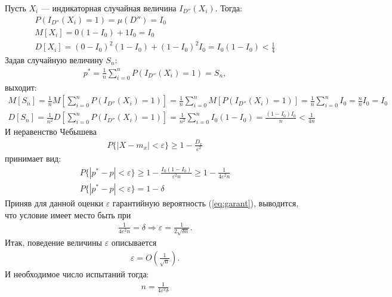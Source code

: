 Пусть \(X_i\) --- индикаторная случайная величина \(I_{D''}(X_i)\). Тогда:
\begin{align}
	P(I_{D''}(X_i)=1) = \mu(D'') = I_0 \\
	M[X_i] = 0(1 - I_0) + 1 I_0 = I_0  \\
	D[X_i] = (0 - I_0)^2 (1 - I_0) + (1 - I_0)^2 I_0 = I_0(1-I_0) < \frac{1}{4}
\end{align}
Задав случайную величину \(S_n\):
\begin{align}
	p^* = \frac{1}{n}\sum_{i=0}^n P(I_{D''}(X_i) = 1) = S_n,
\end{align}
выходит:
\begin{align}
	M[S_n] = \frac{1}{n}M[\sum_{i=0}^n P(I_{D''}(X_i) = 1)] = \frac{1}{n}\sum_{i=0}^n M[P(I_{D''}(X_i) = 1)] = \frac{1}{n}\sum_{i=0}^n I_0 = \frac{n}{n}I_0 = I_0 \\
	D[S_n] = \frac{1}{n^2}D[\sum_{i=0}^n P(I_{D''}(X_i) = 1)] =  \frac{1}{n^2}\sum_{i=0}^n I_0(1-I_0) = \frac{(1 - I_0)I_0}{n} < \frac{1}{4n}
\end{align}
И неравенство Чебышева
\begin{align}
	P\{|X-m_x|<\varepsilon\} \geq 1 - \frac{D_x}{\varepsilon^2}
\end{align}
принимает вид:
\begin{align}
	P\{|p^* - p|<\varepsilon\} \geq 1 - \frac{I_0(1-I_0)}{\varepsilon^2 n} \geq 1 - \frac{1}{4 \varepsilon^2 n} \\
	\label{eq:garant}
	P\{|p^* - p|<\varepsilon\} = 1 - \delta
\end{align}
Приняв для данной оценки \(\varepsilon\) гарантийную вероятность (\ref{eq:garant}), выводится, что условие имеет место быть при
\begin{align}
	\frac{1}{4 \varepsilon^2 n} = \delta \Longrightarrow \varepsilon = \frac{1}{2\sqrt{\delta n}}.
\end{align}
Итак, поведение величины \(\varepsilon\) описывается
\begin{align}\label{eq:o-desc}
	\varepsilon = O\left(\frac{1}{\sqrt{n}}\right).
\end{align}
И необходимое число испытаний тогда:
\begin{align}
	n = \frac{1}{4 \varepsilon^2 \delta}
\end{align}
